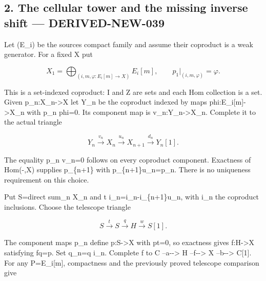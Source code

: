 \documentclass[11pt]{article}
\begin{document}
\subsection{2. The cellular tower and the missing inverse shift --- DERIVED-NEW-039}\label{proofs-11121-11450-the-cellular-tower-and-the-missing-inverse-shift-derived-new-039}

Let (E\_\allowbreak{}i)\allowbreak{} be the source\textquotesingle s compact family and assume their coproduct is a weak generator. For a fixed X put

\[
 X_1=\bigoplus_{(i,m,\varphi:E_i[m]\to X)}E_i[m],
 \qquad p_1|_{(i,m,\varphi)}=\varphi.
\]

This is a set-indexed coproduct:\allowbreak{} I and Z are sets and each Hom collection is a set. Given p\_\allowbreak{}n:\allowbreak{}X\_\allowbreak{}n\allowbreak{}->X let Y\_\allowbreak{}n be the coproduct indexed by maps phi:\allowbreak{}E\_\allowbreak{}i[m]\allowbreak{}\allowbreak{}->X\_\allowbreak{}n with p\_\allowbreak{}n phi\allowbreak{}=0. Its component map is v\_\allowbreak{}n:\allowbreak{}Y\_\allowbreak{}n\allowbreak{}->X\_\allowbreak{}n. Complete it to the actual triangle

\[
 Y_n\xrightarrow{v_n}X_n\xrightarrow{u_n}X_{n+1}
          \xrightarrow{d_n}Y_n[1].
\]

The equality p\_\allowbreak{}n v\_\allowbreak{}n\allowbreak{}=0 follows on every coproduct component. Exactness of Hom(-,\allowbreak{}X)\allowbreak{} supplies p\_\allowbreak{}\{n\allowbreak{}+1\} with p\_\allowbreak{}\{n\allowbreak{}+1\}u\_\allowbreak{}n\allowbreak{}=p\_\allowbreak{}n. There is no uniqueness requirement on this choice.

Put S\allowbreak{}=direct sum\_\allowbreak{}n X\_\allowbreak{}n and t i\_\allowbreak{}n\allowbreak{}=i\_\allowbreak{}n-i\_\allowbreak{}\{n\allowbreak{}+1\}u\_\allowbreak{}n,\allowbreak{} with i\_\allowbreak{}n the coproduct inclusions. Choose the telescope triangle

\[
 S\xrightarrow t S\xrightarrow q H\xrightarrow w S[1].
\]

The component maps p\_\allowbreak{}n define p:\allowbreak{}S\allowbreak{}->X with pt\allowbreak{}=0,\allowbreak{} so exactness gives f:\allowbreak{}H\allowbreak{}->X satisfying fq\allowbreak{}=p. Set q\_\allowbreak{}n\allowbreak{}=q i\_\allowbreak{}n. Complete f to C --a-\allowbreak{}-> H --f-\allowbreak{}-> X --b-\allowbreak{}-> C[1]\allowbreak{}. For any P\allowbreak{}=E\_\allowbreak{}i[m]\allowbreak{},\allowbreak{} compactness and the previously proved telescope comparison give
\end{document}
